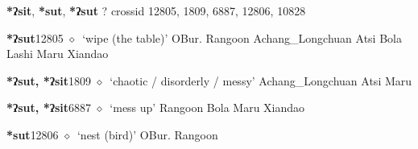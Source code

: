 \item
\textbf{*ʔsit}, \textbf{*sut}, \textbf{*ʔsut}
?
  {\tiny crossid 12805, 1809, 6887, 12806, 10828}
  \begin{list}{}{\leftmargin=1.5em \itemindent=-1.5em}
  \item {\footnotesize \textbf{*ʔsut}}{\tiny 12805}
         $\diamond$~`wipe (the table)'
         OBur. 
\hspace{1ex}
         Rangoon 
\hspace{1ex}
         Achang\_Longchuan 
\hspace{1ex}
         Atsi 
\hspace{1ex}
         Bola 
\hspace{1ex}
         Lashi 
\hspace{1ex}
         Maru 
\hspace{1ex}
         Xiandao 
  \item {\footnotesize \textbf{*ʔsut, *ʔsit}}{\tiny 1809}
\hspace{1ex}
         $\diamond$~`chaotic / disorderly / messy'
         Achang\_Longchuan 
\hspace{1ex}
         Atsi 
\hspace{1ex}
         Maru 
  \item {\footnotesize \textbf{*ʔsut, *ʔsit}}{\tiny 6887}
\hspace{1ex}
         $\diamond$~`mess up'
         Rangoon 
\hspace{1ex}
         Bola 
\hspace{1ex}
         Maru 
\hspace{1ex}
         Xiandao 
  \item {\footnotesize \textbf{*sut}}{\tiny 12806}
\hspace{1ex}
         $\diamond$~`nest (bird)'
         OBur. 
\hspace{1ex}
         Rangoon 

\end{list}
